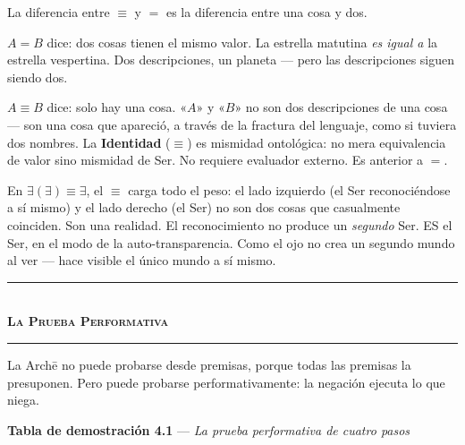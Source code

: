 \documentclass[10pt, openany, oneside]{book}
\renewcommand{\normalsize}{\fontsize{10}{13}\selectfont}
\begin{document}
\noindent La diferencia entre $\equiv$ y $=$ es la diferencia entre una cosa y dos.

$A = B$ dice: dos cosas tienen el mismo valor. La estrella matutina \textit{es igual a} la estrella vespertina. Dos descripciones, un planeta --- pero las descripciones siguen siendo dos.

$A \equiv B$ dice: solo hay una cosa. «$A$» y «$B$» no son dos descripciones de una cosa --- son una cosa que apareció, a través de la fractura del lenguaje, como si tuviera dos nombres. La \textbf{Identidad} ($\equiv$) es mismidad ontológica: no mera equivalencia de valor sino mismidad de Ser. No requiere evaluador externo. Es anterior a $=$.

En $\exists(\exists) \equiv \exists$, el $\equiv$ carga todo el peso: el lado izquierdo (el Ser reconociéndose a sí mismo) y el lado derecho (el Ser) no son dos cosas que casualmente coinciden. Son una realidad. El reconocimiento no produce un \textit{segundo} Ser. ES el Ser, en el modo de la auto-transparencia. Como el ojo no crea un segundo mundo al ver --- hace visible el único mundo a sí mismo.

\vspace{1.5em}


\begin{center}
    \rule{0.3\textwidth}{0.4pt}\\[0.5em]
    {\normalsize\bfseries\scshape La Prueba Performativa}\\[0.3em]
    \rule{0.3\textwidth}{0.4pt}
\end{center}

\vspace{1em}

\noindent La Arch\={e} no puede probarse desde premisas, porque todas las premisas la presuponen. Pero puede probarse performativamente: la negación ejecuta lo que niega.

\vspace{0.5em}

\textbf{Tabla de demostración 4.1} --- \textit{La prueba performativa de cuatro pasos}

\vspace{0.5em}
\end{document}
